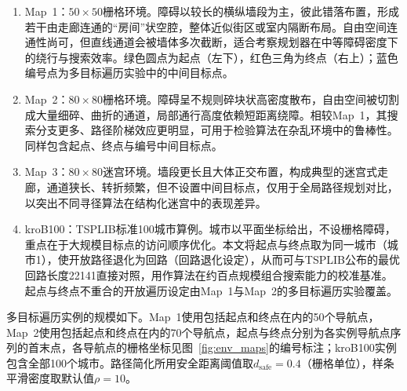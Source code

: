 \documentclass[lettersize,journal]{IEEEtran}
\begin{document}
\begin{enumerate}

\item Map~1：$50\times 50$栅格环境。障碍以较长的横纵墙段为主，彼此错落布置，形成若干由走廊连通的“房间”状空腔，整体近似街区或室内隔断布局。自由空间连通性尚可，但直线通道会被墙体多次截断，适合考察规划器在中等障碍密度下的绕行与搜索效率。绿色圆点为起点（左下），红色三角为终点（右上）；蓝色编号点为多目标遍历实验中的中间目标点。

\item Map~2：$80\times 80$栅格环境。障碍呈不规则碎块状高密度散布，自由空间被切割成大量细碎、曲折的通道，局部通行高度依赖短距离绕障。相较Map~1，其搜索分支更多、路径阶梯效应更明显，可用于检验算法在杂乱环境中的鲁棒性。同样包含起点、终点与编号中间目标点。

\item Map~3：$80\times 80$迷宫环境。墙段更长且大体正交布置，构成典型的迷宫式走廊，通道狭长、转折频繁，但不设置中间目标点，仅用于全局路径规划对比，以突出不同寻径算法在结构化迷宫中的表现差异。

\item kroB100：TSPLIB标准100城市算例。城市以平面坐标给出，不设栅格障碍，重点在于大规模目标点的访问顺序优化。本文将起点与终点取为同一城市（城市1），使开放路径退化为回路（回路退化设定），从而可与TSPLIB公布的最优回路长度22141直接对照，用作算法在约百点规模组合搜索能力的校准基准。起点与终点不重合的开放遍历设定由Map~1与Map~2的多目标遍历实验覆盖。

\end{enumerate}

多目标遍历实例的规模如下。Map~1使用包括起点和终点在内的50个导航点，Map~2使用包括起点和终点在内的70个导航点，起点与终点分别为各实例导航点序列的首末点，各导航点的栅格坐标见图~\textcolor{blue}{\ref{fig:env_maps}}的编号标注；kroB100实例包含全部100个城市。路径简化所用安全距离阈值取$d_{\mathrm{safe}} = 0.4$（栅格单位），样条平滑密度取默认值$\rho = 10$。
\end{document}
